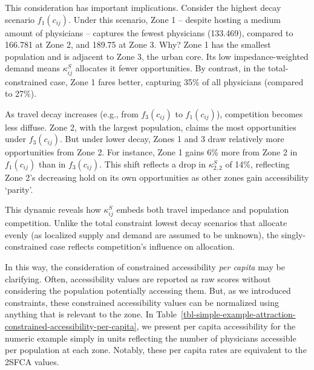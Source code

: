 \documentclass[
  10pt,
  letterpaper,
]{article}
\begin{document}
This consideration has important implications. Consider the highest
decay scenario \(f_1(c_{ij})\). Under this scenario, Zone 1 -- despite
hosting a medium amount of physicians -- captures the fewest physicians
(133.469), compared to 166.781 at Zone 2, and 189.75 at Zone 3. Why?
Zone 1 has the smallest population and is adjacent to Zone 3, the urban
core. Its low impedance-weighted demand means \(\kappa^S_{ij}\)
allocates it fewer opportunities. By contrast, in the total-constrained
case, Zone 1 fares better, capturing 35\% of all physicians (compared to
27\%).

As travel decay increases (e.g., from \(f_3(c_{ij})\) to
\(f_1(c_{ij})\)), competition becomes less diffuse. Zone 2, with the
largest population, claims the most opportunities under \(f_3(c_{ij})\).
But under lower decay, Zones 1 and 3 draw relatively more opportunities
from Zone 2. For instance, Zone 1 gains 6\% more from Zone 2 in
\(f_1(c_{ij})\) than in \(f_3(c_{ij})\). This shift reflects a drop in
\(\kappa^S_{2,2}\) of 14\%, reflecting Zone 2's decreasing hold on its
own opportunities as other zones gain accessibility `parity'.

This dynamic reveals how \(\kappa^S_{ij}\) embeds both travel impedance
and population competition. Unlike the total constraint lowest decay
scenarios that allocate evenly (as localized supply and demand are
assumed to be unknown), the singly-constrained case reflects
competition's influence on allocation.

In this way, the consideration of constrained accessibility \emph{per
capita} may be clarifying. Often, accessibility values are reported as
raw scores without considering the population potentially accessing
them. But, as we introduced constraints, these constrained accessibility
values can be normalized using anything that is relevant to the zone. In
Table~\ref{tbl-simple-example-attraction-constrained-accessibility-per-capita},
we present per capita accessibility for the numeric example simply in
units reflecting the number of physicians accessible per population at
each zone. Notably, these per capita rates are equivalent to the 2SFCA
values.
\end{document}
